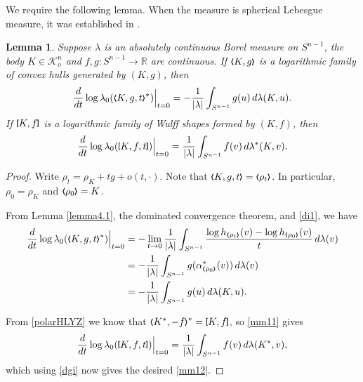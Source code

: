 \documentclass{cpamart1}     %
\newtheorem{lemm}[theo]{Lemma}
\theoremstyle{definition}
\theoremstyle{remark}
\newcommand{\ro}{\mathbb R}
\newcommand{\sn}{S^{n-1}}
\newcommand{\kno}{\mathcal K^n_o}
\newcommand{\blb}{\raise.3ex\hbox{$\scriptstyle \pmb \lbrack$}}
\newcommand{\brb}{\raise.3ex\hbox{$\scriptstyle \pmb \rbrack$}}
\newcommand{\bla}{\raise.2ex\hbox{$\scriptstyle\pmb \langle$}}
\newcommand{\sbla}{\raise.1ex\hbox{$\scriptscriptstyle\pmb \langle$}}
\newcommand{\bra}{\raise.2ex\hbox{$\scriptstyle\pmb \rangle$}}
\newcommand{\sbra}{\raise.1ex\hbox{$\scriptscriptstyle\pmb \rangle$}}
\begin{document}
We require the following lemma. When the measure is spherical Lebesgue measure, it was established in \cite{HLYZ16}.



\begin{lemm}\label{val-f}
Suppose $\lambda$ is an absolutely continuous Borel measure on $\sn$, the body $K \in \kno$ and $f, g : \sn \to \ro$ are continuous.
If $\bla K, g\bra$ is a logarithmic family of convex hulls generated by $(K,g)$, then
\begin{equation}\label{mm11}
\frac{d}{dt} \log\lambda_0(\bla K,g,t\bra^*)\Big|_{t=0}
= -\frac1{|\lambda|}\int_{\sn} g(u)\, d\lambda(K,u).
\end{equation}
If $\blb K,f\brb$ is a logarithmic family of Wulff shapes formed by $(K,f)$, then
\begin{equation}\label{mm12}
\frac{d}{dt} \log\lambda_0(\blb K,f,t\brb)\Big|_{t=0}
= \frac1{|\lambda|}\int_{\sn} f(v)\, d\lambda^*(K,v).
\end{equation}
\end{lemm}


\begin{proof}
Write $\rho_t=\rho_K+tg+o(t,\cdot)$. Note that $\bla K,g,t\bra=\bla \rho_t\bra$. In particular, $\rho_0=\rho_K$ and $\bla \rho_0\bra = K$.

From Lemma \ref{lemma4.1}, the dominated convergence theorem, and \eqref{di1}, we have
\begin{align*}
\frac{d}{dt} \log\lambda_0(\bla K,g,t\bra^*)\Big|_{t=0}
&=-\lim_{t\to 0}\frac1{|\lambda|}\int_{\sn}
\frac{\log h_{\sbla \rho_{t} \sbra}(v)
- \log h_{\sbla \rho_{0} \sbra}(v)}t \, d\lambda(v) \\
&=-\frac1{|\lambda|}\int_{\sn}
        g(\alpha_{\sbla \rho_{0} \sbra}^{*}(v))\, d\lambda(v) \\
&=-\frac1{|\lambda|}\int_{\sn} g(u)\, d\lambda(K, u).
\end{align*}

From \eqref{polarHLYZ} we know that $\bla K^*, -f\bra^*= \blb K, f\brb$, so \eqref{mm11} gives
\begin{equation*}
\frac{d}{dt} \log\lambda_0(\blb K, f,t\brb)\Big|_{t=0}
= \frac1{|\lambda|}\int_{\sn} f(v)\, d\lambda(K^*,v),
\end{equation*}
which using \eqref{dgi} now gives the desired \eqref{mm12}.
\end{proof}
\end{document}
